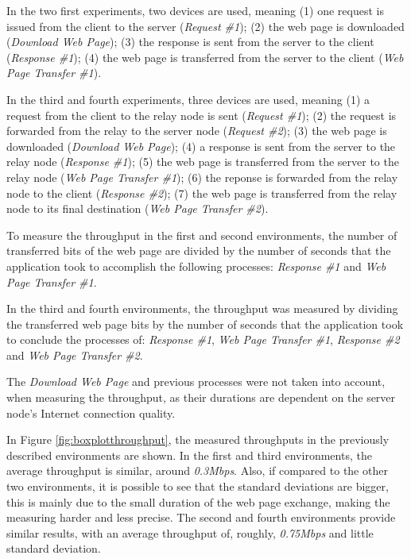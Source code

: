 In the two first experiments, two devices are used, meaning (1) one request is issued from the client to the server (\textit{Request \#1}); (2) the web page is downloaded (\textit{Download Web Page}); (3) the response is sent from the server to the client (\textit{Response \#1}); (4) the web page is transferred from the server to the client (\textit{Web Page Transfer \#1}).

In the third and fourth experiments, three devices are used, meaning (1) a request from the client to the relay node is sent (\textit{Request \#1}); (2) the request is forwarded from the relay to the server node (\textit{Request \#2}); (3) the web page is downloaded (\textit{Download Web Page}); (4) a response is sent from the server to the relay node (\textit{Response \#1}); (5) the web page is transferred from the server to the relay node (\textit{Web Page Transfer \#1}); (6) the reponse is forwarded from the relay node to the client (\textit{Response \#2}); (7) the web page is transferred from the relay node to its final destination (\textit{Web Page Transfer \#2}).

To measure the throughput in the first and second environments, the number of transferred bits of the web page are divided by the number of seconds that the application took to accomplish the following processes: \textit{Response \#1} and \textit{Web Page Transfer \#1}.

In the third and fourth environments, the throughput was measured by dividing the transferred web page bits by the number of seconds that the application took to conclude the processes of: \textit{Response \#1}, \textit{Web Page Transfer \#1}, \textit{Response \#2} and \textit{Web Page Transfer \#2}.

The \textit{Download Web Page} and previous processes were not taken into account, when measuring the throughput, as their durations are dependent on the server node's Internet connection quality.

In Figure \ref{fig:boxplotthroughput}, the measured throughputs in the previously described environments are shown. In the first and third environments, the average throughput is similar, around \textit{0.3Mbps}. Also, if compared to the other two environments, it is possible to see that the standard deviations are bigger, this is mainly due to the small duration of the web page exchange, making the measuring harder and less precise. The second and fourth environments provide similar results, with an average throughput of, roughly, \textit{0.75Mbps} and little standard deviation.

